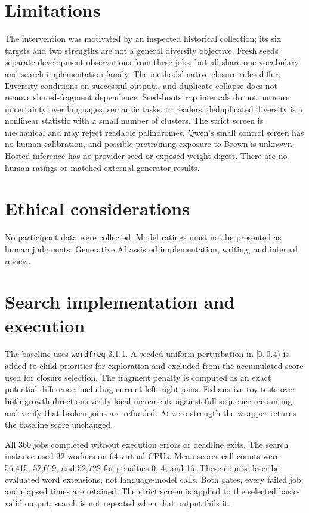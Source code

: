 \documentclass[11pt]{article}
\newcommand{\code}[1]{\texttt{#1}}
\begin{document}
\section*{Limitations}
The intervention was motivated by an inspected historical collection; its six targets and two strengths are not a general diversity objective. Fresh seeds separate development observations from these jobs, but all share one vocabulary and search implementation family. The methods' native closure rules differ. Diversity conditions on successful outputs, and duplicate collapse does not remove shared-fragment dependence. Seed-bootstrap intervals do not measure uncertainty over languages, semantic tasks, or readers; deduplicated diversity is a nonlinear statistic with a small number of clusters. The strict screen is mechanical and may reject readable palindromes. Qwen's small control screen has no human calibration, and possible pretraining exposure to Brown is unknown. Hosted inference has no provider seed or exposed weight digest. There are no human ratings or matched external-generator results.

\section*{Ethical considerations}
No participant data were collected. Model ratings must not be presented as human judgments. Generative AI assisted implementation, writing, and internal review.


\appendix
\section{Search implementation and execution}
The baseline uses \code{wordfreq} 3.1.1. A seeded uniform perturbation in $[0,0.4)$ is added to child priorities for exploration and excluded from the accumulated score used for closure selection. The fragment penalty is computed as an exact potential difference, including current left--right joins. Exhaustive toy tests over both growth directions verify local increments against full-sequence recounting and verify that broken joins are refunded. At zero strength the wrapper returns the baseline score unchanged.

All 360 jobs completed without execution errors or deadline exits. The search instance used 32 workers on 64 virtual CPUs. Mean scorer-call counts were 56,415, 52,679, and 52,722 for penalties 0, 4, and 16. These counts describe evaluated word extensions, not language-model calls. Both gates, every failed job, and elapsed times are retained. The strict screen is applied to the selected basic-valid output; search is not repeated when that output fails it.
\end{document}
